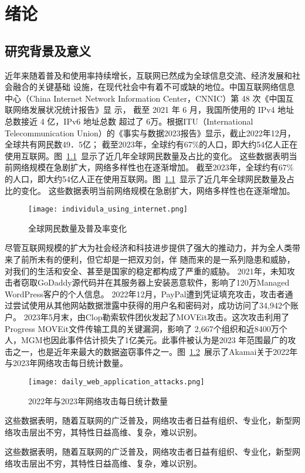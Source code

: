 \chapter{绪论}
\label{cha:overview}

\section{研究背景及意义}

近年来随着普及和使用率持续增长，互联网已然成为全球信息交流、经济发展和社会融合的关键基础
设施，在现代社会中有着不可或缺的地位。中国互联网络信息中心（China Internet 
Network Information Center，CNNIC）第 48 次《中国互联网络发展状况统计报告》显
示\cite{cnnic2021}， 截至 2021 年 6 月，我国所使用的 IPv4 地址总数接近 4 亿，IPv6 地址总数
超过了 6万。根据ITU（International Telecommunication Union）的《事实与数据2023报告》显示\cite{itu2023}，截止2022年12月，全球共有网民数49．5亿；
截至2023年，全球约有67\%的人口，即大约54亿人正在使用互联网。图~\ref{fig:individula_using_internet}~显示了近几年全球网民数量及占比的变化。
这些数据表明当前网络规模在急剧扩大，网络多样性也在逐渐增加。
截至2023年，全球约有67\%的人口，即大约54亿人正在使用互联网。图~\ref{fig:individula_using_internet}~显示了近几年全球网民数量及占比的变化。
这些数据表明当前网络规模在急剧扩大，网络多样性也在逐渐增加。
\begin{figure}[htbp]
    \centering
    \texttt{[image: individula\_using\_internet.png]}
    \caption{全球网民数量及普及率变化\cite{fig-itu2023}}
    \label{fig:individula_using_internet}
\end{figure} 


尽管互联网规模的扩大为社会经济和科技进步提供了强大的推动力，并为全人类带来了前所未有的便利，但它却是一把双刃剑，伴
随而来的是一系列隐患和威胁，对我们的生活和安全、甚至是国家的稳定都构成了严重的威胁。
2021年，未知攻击者窃取GoDaddy源代码并在其服务器上安装恶意软件，影响了120万Managed WordPress客户的个人信息。
2022年12月，PayPal遭到凭证填充攻击，攻击者通过尝试使用从其他网站数据泄露中获得的用户名和密码对，成功访问了34,942个账户。
2023年5月末，由Clop勒索软件团伙发起了MOVEit攻击。这次攻击利用了Progress MOVEit文件传输工具的关键漏洞，影响了
2,667个组织和近8400万个人，MGM也因此事件估计损失了1亿美元​。此事件被认为是2023
年范围最广的攻击之一，也是近年来最大的数据盗窃事件之一。图~\ref{fig:daily_web_application_attacks}~展示了Akamai关于2022年
与2023年网络攻击每日统计数量。
\begin{figure}[htbp]
  \centering
  \texttt{[image: daily\_web\_application\_attacks.png]}
  \caption{2022年与2023年网络攻击每日统计数量\cite{akamai}}
  \label{fig:daily_web_application_attacks}
\end{figure}
这些数据表明，随着互联网的广泛普及，网络攻击者日益有组织、专业化，新型网络攻击层出不穷，其特性日益高维、复杂，难以识别。\par
这些数据表明，随着互联网的广泛普及，网络攻击者日益有组织、专业化，新型网络攻击层出不穷，其特性日益高维、复杂，难以识别。\par

